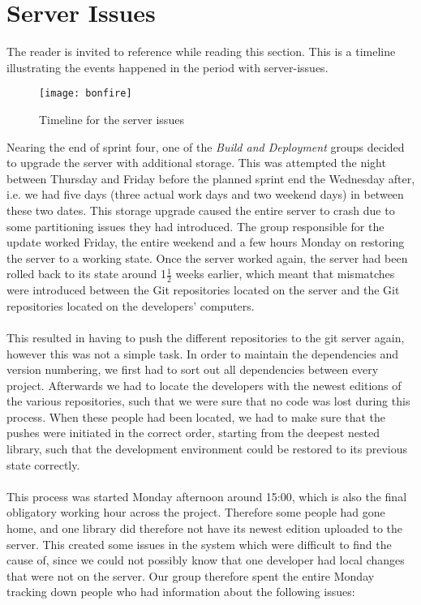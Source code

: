
\section{Server Issues}
\label{sec:server_issues}

The reader is invited to reference  while reading this section. This is a timeline illustrating the events happened in the period with server-issues. 

\begin{figure}[!htbp]
	\centering
	\texttt{[image: bonfire]}
	\caption{Timeline for the server issues}
	\label{fig:bonefire}
\end{figure}

Nearing the end of sprint four, one of the \emph{Build and Deployment} groups decided to upgrade the server with additional storage. This was attempted the night between Thursday and Friday before the planned sprint end the Wednesday after, i.e. we had five days (three actual work days and two weekend days) in between these two dates. This storage upgrade caused the entire server to crash due to some partitioning issues they had introduced. The group responsible for the update worked Friday, the entire weekend and a few hours Monday on restoring the server to a working state. Once the server worked again, the server had been rolled back to its state around 1$\frac{1}{2}$ weeks earlier, which meant that mismatches were introduced between the Git repositories located on the server and the Git repositories located on the developers' computers. 
\\\\
This resulted in having to push the different repositories to the git server again, however this was not a simple task. In order to maintain the dependencies and version numbering, we first had to sort out all dependencies between every project. Afterwards we had to locate the developers with the newest editions of the various repositories, such that we were sure that no code was lost during this process. When these people had been located, we had to make sure that the pushes were initiated in the correct order, starting from the deepest nested library, such that the development environment could be restored to its previous state correctly.
\\\\
This process was started Monday afternoon around 15:00, which is also the final obligatory working hour across the project. Therefore some people had gone home, and one library did therefore not have its newest edition uploaded to the server. This created some issues in the system which were difficult to find the cause of, since we could not possibly know that one developer had local changes that were not on the server. Our group therefore spent the entire Monday tracking down people who had information about the following issues:

